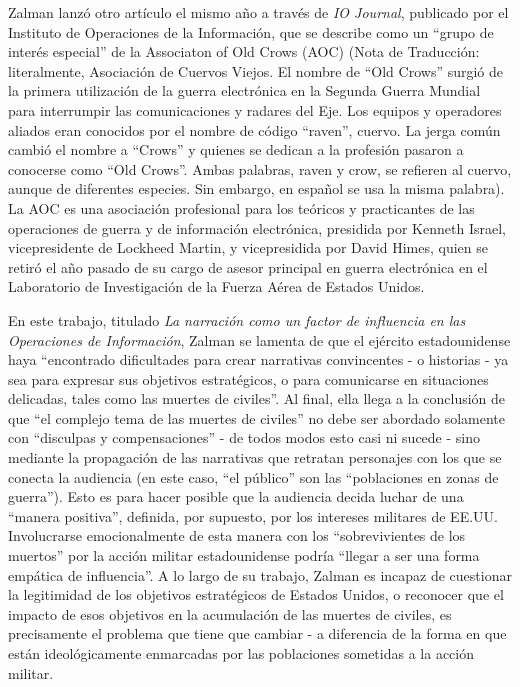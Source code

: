 \documentclass[10pt,a5paper,twoside,spanish,]{book}
\begin{document}
Zalman lanzó otro artículo el mismo año a través de \emph{IO Journal},
publicado por el Instituto de Operaciones de la Información, que se
describe como un ``grupo de interés especial'' de la Associaton of Old
Crows (AOC) (Nota de Traducción: literalmente, Asociación de Cuervos
Viejos. El nombre de ``Old Crows'' surgió de la primera utilización de
la guerra electrónica en la Segunda Guerra Mundial para interrumpir las
comunicaciones y radares del Eje. Los equipos y operadores aliados eran
conocidos por el nombre de código ``raven'', cuervo. La jerga común
cambió el nombre a ``Crows'' y quienes se dedican a la profesión pasaron
a conocerse como ``Old Crows''. Ambas palabras, raven y crow, se
refieren al cuervo, aunque de diferentes especies. Sin embargo, en
español se usa la misma palabra). La AOC es una asociación profesional
para los teóricos y practicantes de las operaciones de guerra y de
información electrónica, presidida por Kenneth Israel, vicepresidente de
Lockheed Martin, y vicepresidida por David Himes, quien se retiró el año
pasado de su cargo de asesor principal en guerra electrónica en el
Laboratorio de Investigación de la Fuerza Aérea de Estados Unidos.

En este trabajo, titulado \emph{La narración como un factor de
influencia en las Operaciones de Información}, Zalman se lamenta de que
el ejército estadounidense haya ``encontrado dificultades para crear
narrativas convincentes - o historias - ya sea para expresar sus
objetivos estratégicos, o para comunicarse en situaciones delicadas,
tales como las muertes de civiles''. Al final, ella llega a la
conclusión de que ``el complejo tema de las muertes de civiles'' no debe
ser abordado solamente con ``disculpas y compensaciones'' - de todos
modos esto casi ni sucede - sino mediante la propagación de las
narrativas que retratan personajes con los que se conecta la audiencia
(en este caso, ``el público'' son las ``poblaciones en zonas de
guerra''). Esto es para hacer posible que la audiencia decida luchar de
una ``manera positiva'', definida, por supuesto, por los intereses
militares de EE.UU. Involucrarse emocionalmente de esta manera con los
``sobrevivientes de los muertos'' por la acción militar estadounidense
podría ``llegar a ser una forma empática de influencia''. A lo largo de
su trabajo, Zalman es incapaz de cuestionar la legitimidad de los
objetivos estratégicos de Estados Unidos, o reconocer que el impacto de
esos objetivos en la acumulación de las muertes de civiles, es
precisamente el problema que tiene que cambiar - a diferencia de la
forma en que están ideológicamente enmarcadas por las poblaciones
sometidas a la acción militar.
\end{document}
